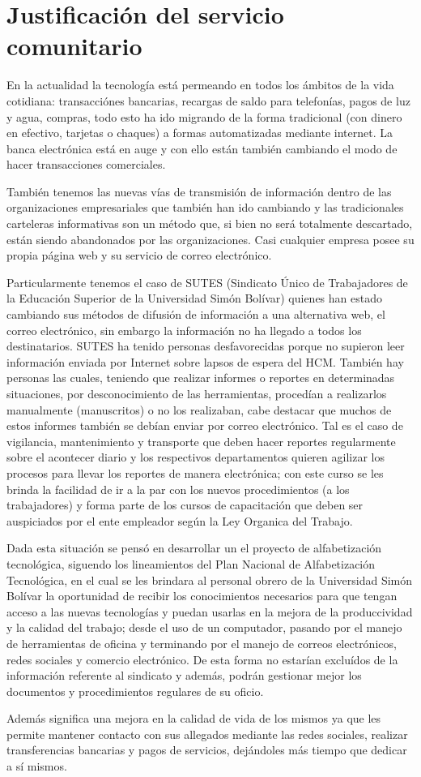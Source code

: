 \chapter{Justificación del servicio comunitario}
        En la actualidad la tecnología está permeando en todos los ámbitos de la vida cotidiana: transacciónes bancarias, recargas de saldo para telefonías, pagos de luz y agua, compras, todo esto ha ido migrando de la forma tradicional (con dinero en efectivo, tarjetas o chaques) a formas automatizadas mediante internet. La banca electrónica está en auge y con ello están también cambiando el modo de hacer transacciones comerciales.
        
        También tenemos las nuevas vías de transmisión de información dentro de las organizaciones empresariales que también han ido cambiando y las tradicionales carteleras informativas son un método que, si bien no será totalmente descartado, están siendo abandonados por las organizaciones. Casi cualquier empresa posee su propia página web y su servicio de correo electrónico.

		Particularmente tenemos el caso de SUTES (Sindicato Único de Trabajadores de la Educación Superior de la Universidad Simón Bolívar) quienes han estado cambiando sus métodos de difusión de información a una alternativa web, el correo electrónico, sin embargo la información no ha llegado a todos los destinatarios. SUTES ha tenido personas desfavorecidas porque no supieron leer información enviada por Internet sobre lapsos de espera del HCM. También hay personas las cuales, teniendo que realizar informes o reportes en determinadas situaciones, por desconocimiento de las herramientas, procedían a realizarlos manualmente (manuscritos) o no los realizaban, cabe destacar que muchos de estos informes también se debían enviar por correo electrónico. Tal es el caso de vigilancia, mantenimiento y transporte que deben hacer reportes regularmente sobre el acontecer diario y los respectivos departamentos quieren agilizar los procesos para llevar los reportes de manera electrónica; con este curso se les brinda la facilidad de ir a la par con los nuevos procedimientos (a los trabajadores) y forma parte de los cursos de capacitación que deben ser auspiciados por el ente empleador según la Ley Organica del Trabajo.
        
        Dada esta situación se pensó en desarrollar un el proyecto de alfabetización tecnológica, siguendo los lineamientos del Plan Nacional de Alfabetización Tecnológica\cite{infocentro,PNAT}, en el cual se les brindara al personal obrero de la Universidad Simón Bolívar la oportunidad de recibir los conocimientos necesarios para que tengan acceso a las nuevas tecnologías y puedan usarlas en la mejora de la produccividad y la calidad del trabajo; desde el uso de un computador, pasando por el manejo de herramientas de oficina y terminando por el manejo de correos electrónicos, redes sociales y comercio electrónico. De esta forma no estarían excluídos de la información referente al sindicato y además, podrán gestionar mejor los documentos y procedimientos regulares de su oficio.
        
        Además significa una mejora en la calidad de vida de los mismos ya que les permite mantener contacto con sus allegados mediante las redes sociales, realizar transferencias bancarias y pagos de servicios, dejándoles más tiempo que dedicar a sí mismos.
	\pagebreak